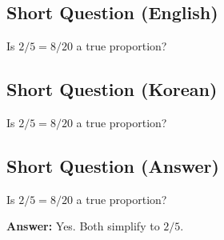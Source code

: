 \cleardoublepage
\subsection*{Short Question (English)}
Is $2/5 = 8/20$ a true proportion?


\newpage
\subsection*{Short Question (Korean)}
Is $2/5 = 8/20$ a true proportion?


\newpage
\subsection*{Short Question (Answer)}
Is $2/5 = 8/20$ a true proportion?

\textbf{Answer:} Yes. Both simplify to $2/5$.
